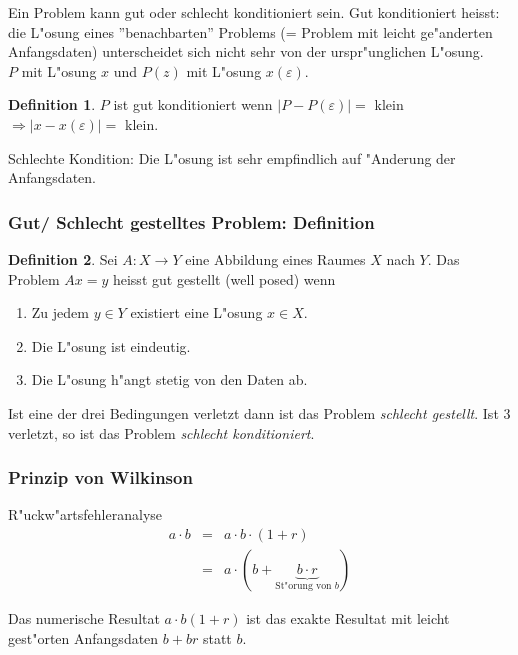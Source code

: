 \documentclass[german, 10pt, a4paper, twocolumn]{scrartcl}
\theoremstyle{definition}
\newtheorem*{definition}{Definition}
\begin{document}
Ein Problem kann gut oder schlecht konditioniert sein. Gut konditioniert heisst: die L"osung eines ''benachbarten'' Problems (= Problem mit leicht ge"anderten Anfangsdaten) unterscheidet sich nicht sehr von der urspr"unglichen L"osung.\\

$P$ mit L"osung $x$ und $P(z)$ mit L"osung $x(\varepsilon)$.

\begin{definition}
	$P$ ist gut konditioniert wenn $|P-P(\varepsilon)| =$ klein $\Rightarrow | x - x(\varepsilon)|=$ klein.
\end{definition}

Schlechte Kondition: Die L"osung ist sehr empfindlich auf "Anderung der Anfangsdaten.

\subsubsection{Gut/ Schlecht gestelltes Problem: Definition}

\begin{definition}
	Sei $A: X \rightarrow Y$ eine Abbildung eines Raumes $X$ nach $Y$. Das Problem $Ax = y$ heisst gut gestellt (well posed) wenn
	\begin{enumerate}
		\item Zu jedem $y\in Y$ existiert eine L"osung $x\in X$.
		\item Die L"osung ist eindeutig.
		\item Die L"osung h"angt stetig von den Daten ab.
	\end{enumerate}

	Ist eine der drei Bedingungen verletzt dann ist das Problem \textit{schlecht gestellt}. Ist 3 verletzt, so ist das Problem \textit{schlecht konditioniert}.
\end{definition}

\subsubsection{Prinzip von Wilkinson}

R"uckw"artsfehleranalyse
\begin{eqnarray}
	a\cdotp b&	= &	a\cdotp b \cdotp (1+r) \nonumber \\
	&		= &	a \cdotp (b+\underbrace{b\cdotp r}_{\mbox{St"orung von }b}) \nonumber
\end{eqnarray}

Das numerische Resultat $a\cdotp b (1+r)$ ist das exakte Resultat mit leicht gest"orten Anfangsdaten $b+br$ statt $b$.
\end{document}
